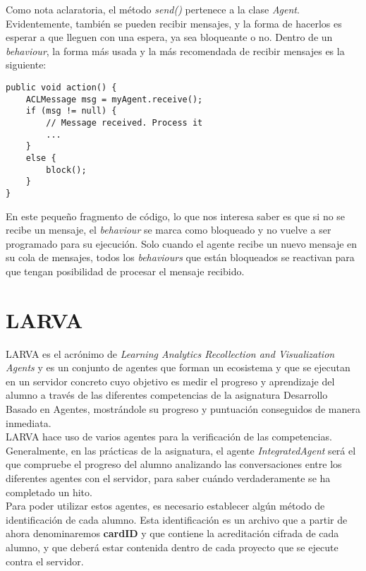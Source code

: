 Como nota aclaratoria, el método \textit{send()} pertenece a la clase \textit{Agent}.\\

Evidentemente, también se pueden recibir mensajes, y la forma de hacerlos es esperar a que lleguen con una espera, ya sea bloqueante o no. Dentro de un \textit{behaviour}, la forma más usada y la más recomendada de recibir mensajes es la siguiente:\\

\begin{lstlisting}
public void action() {
    ACLMessage msg = myAgent.receive();
    if (msg != null) {
        // Message received. Process it
        ...
    }
    else {
        block();
    }
}
\end{lstlisting}

En este pequeño fragmento de código, lo que nos interesa saber es que si no se recibe un mensaje, el \textit{behaviour} se marca como bloqueado y no vuelve a ser programado para su ejecución. Solo cuando el agente recibe un nuevo mensaje en su cola de mensajes, todos los \textit{behaviours} que están bloqueados se reactivan para que tengan posibilidad de procesar el mensaje recibido.

\section{LARVA}

LARVA es el acrónimo de \textit{Learning Analytics Recollection and Visualization Agents} y es un conjunto de agentes que forman un ecosistema y que se ejecutan en un servidor concreto cuyo objetivo es medir el progreso y aprendizaje del alumno a través de las diferentes competencias de la asignatura Desarrollo Basado en Agentes, mostrándole su progreso y puntuación conseguidos de manera inmediata.\\

LARVA hace uso de varios agentes para la verificación de las competencias. Generalmente, en las prácticas de la asignatura, el agente \textit{IntegratedAgent} será el que compruebe el progreso del alumno analizando las conversaciones entre los diferentes agentes con el servidor, para saber cuándo verdaderamente se ha completado un hito.\\

Para poder utilizar estos agentes, es necesario establecer algún método de identificación de cada alumno. Esta identificación es un archivo que a partir de ahora denominaremos \textbf{cardID} y que contiene la acreditación cifrada de cada alumno, y que deberá estar contenida dentro de cada proyecto que se ejecute contra el servidor.